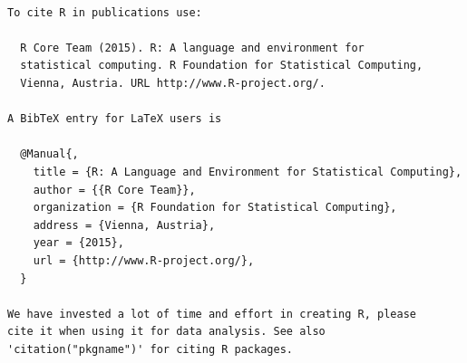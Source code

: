 \documentclass[]{article}
\begin{document}
\begin{verbatim}

To cite R in publications use:

  R Core Team (2015). R: A language and environment for
  statistical computing. R Foundation for Statistical Computing,
  Vienna, Austria. URL http://www.R-project.org/.

A BibTeX entry for LaTeX users is

  @Manual{,
    title = {R: A Language and Environment for Statistical Computing},
    author = {{R Core Team}},
    organization = {R Foundation for Statistical Computing},
    address = {Vienna, Austria},
    year = {2015},
    url = {http://www.R-project.org/},
  }

We have invested a lot of time and effort in creating R, please
cite it when using it for data analysis. See also
'citation("pkgname")' for citing R packages.
\end{verbatim}
\end{document}
